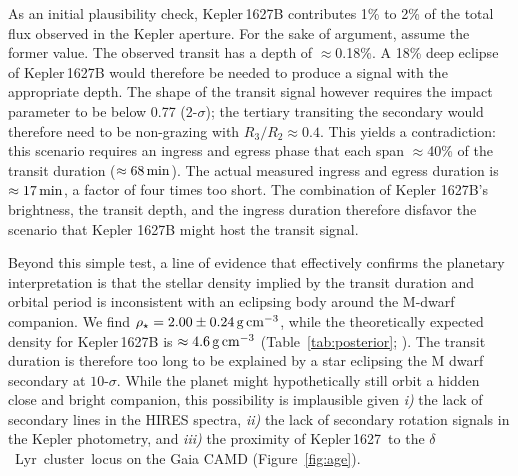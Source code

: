 \documentclass[12pt,modern,twocolumn,tighten,linenumbers,trackchanges]{aastex63}
\newcommand{\cn}{$\delta$\ Lyr\ cluster} %
\newcommand{\sn}{Kepler\,1627} %
\begin{document}

As an initial plausibility check, Kepler\,1627B contributes 1\% to 2\%
of the total flux observed in the Kepler aperture.  For the sake of
argument, assume the former value.  The observed transit has a depth
of $\approx$0.18\%.  A 18\% deep eclipse of Kepler\,1627B would
therefore be needed to produce a signal with the appropriate depth.
The shape of the transit signal however requires the impact parameter
to be below 0.77 (2-$\sigma$); the tertiary transiting the secondary
would therefore need to be non-grazing with $R_3/R_2 \approx 0.4$.
This yields a contradiction:  this scenario requires an ingress
and egress phase that each span $\approx$40\% of the transit duration
($\approx 68\,{\rm min}$).  The actual measured ingress and egress
duration is $\approx 17\,{\rm min}$, a factor of four times too
short.  The combination of Kepler 1627B's brightness, the transit
depth, and the ingress duration therefore disfavor the scenario that
Kepler 1627B might host the transit signal.  


Beyond this simple test, a line of evidence that
effectively confirms the planetary interpretation is that the stellar density
implied by the transit duration and orbital period is inconsistent
with an eclipsing body around the M-dwarf companion.  We find
$\rho_\star = 2.00 \pm 0.24\,{\rm g\,cm}^{-3}$, while the
theoretically expected density for Kepler\,1627B is $\approx 4.6\,{\rm
g\,cm}^{-3}$ (Table~\ref{tab:posterior}; \citealt{choi_mesa_2016}).
The transit duration is therefore too long to be explained by a star
eclipsing the M dwarf secondary at $10$-$\sigma$.  While the planet
might hypothetically still orbit a hidden close and bright companion,
this possibility is implausible given {\it i)} the lack of secondary
lines in the HIRES spectra, {\it ii)} the lack of secondary
rotation signals in the Kepler photometry, and {\it iii)} the proximity
of \sn\ to the \cn\ locus on the Gaia CAMD (Figure~\ref{fig:age}).

\end{document}
